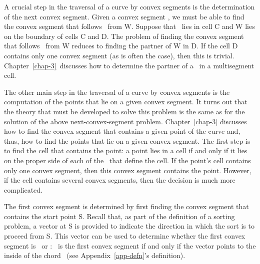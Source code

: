 A crucial step in the traversal of a curve by convex segments is the 
determination of the next convex segment.
Given a convex segment , we must be able to find the
convex segment that follows \ from W.
Suppose that \ lies in cell C and W lies on the boundary
of cells C and D.
The problem of finding the convex segment that follows \
from W reduces to finding the partner of W in D.
If the cell D contains only one convex segment (as is often the case),
then this is trivial.
Chapter~\ref{chap-3}\ discusses how to determine the partner of a 
\wallpoint\ in a multisegment cell.

The other main step in the traversal of a curve by convex segments is
the computation of the points that lie on a given convex segment.
It turns out that the theory that must be developed to solve this problem
is the same as for the solution of the above next-convex-segment problem.
Chapter~\ref{chap-3} discusses how to find the convex segment that 
contains a given point of the curve and, thus, 
how to find the points that lie on a given convex segment.
The first step is to find the cell that contains the point:
a point lies in a cell if and only if it lies on the proper side of each 
of the \walls\ that define the cell.
If the point's cell contains only one convex segment,
then this convex segment contains the point.
However, if the cell contains several convex segments,
then the decision is much more complicated.

The first convex segment is determined by first 
finding the convex segment  that contains the start point S.
Recall that, as part of the definition of a sorting problem, a vector at
S is provided to indicate the direction in which the sort is to proceed
from S.
This vector can be used to 
determine whether the first convex segment is \ or :
\arc{SV}\ is the first convex segment if and only if the vector points to the
inside of the chord \lyne{SV}\ (see Appendix~\ref{app-defn}'s definition).


